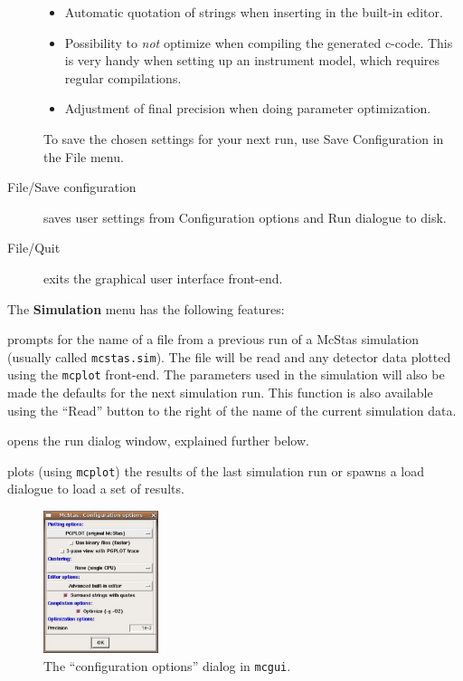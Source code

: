 \begin{description}
\begin{itemize}
  \item Automatic quotation of strings when inserting in the built-in
    editor.
  \item Possibility to \emph{not} optimize when compiling the
    generated c-code. This is very handy when setting up an instrument model, which requires regular compilations.
  \item Adjustment of final precision when doing parameter optimization.
\end{itemize}
To save the chosen settings for your next \MCS run, use Save
Configuration in the File menu.
\item[File/Save configuration] saves user settings from Configuration
  options and Run dialogue to disk.
\item[File/Quit] exits the graphical user interface front-end.
\end{description}

\noindent The {\bf Simulation} menu has the following features:
\begin{description} 
\item[Simulation/Read old simulation] prompts for the name of a file
  from a previous run of a McStas simulation (usually called
  \verb+mcstas.sim+). The file will be read and any detector data
  plotted using the \verb+mcplot+ front-end. The parameters used in the
  simulation will also be made the defaults for the next simulation
  run. This function is also available using the ``Read'' button to the
  right of the name of the current simulation data.
\item[Simulation/Run simulation] opens the run dialog window, explained
  further below.
\item[Simulation/Plot results] plots (using \verb+mcplot+) the results of the
  last simulation run or spawns a load dialogue to load a set of results.
\end{description}


\begin{figure}[htb!]
  \begin{center}
    \includegraphics[width=0.3\textwidth]{figures/choose_backend.eps}
  \end{center}
\caption{The ``configuration options'' dialog in \texttt{mcgui}.} 
\label{fig:mcgui-choose}
\end{figure}


